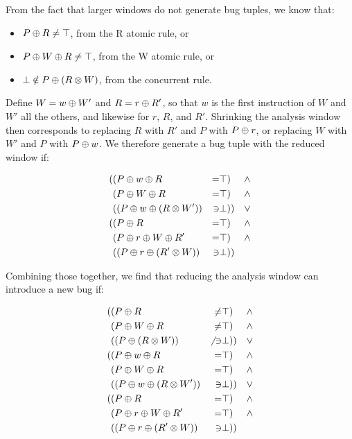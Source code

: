 From the fact that larger windows do not generate bug tuples, we know
that:

\begin{itemize}
\item $P \oplus R \not= \top$, from the R atomic rule, or
\item $P \oplus W \oplus R \not= \top$, from the W atomic rule, or
\item $\bot \notin P \oplus (R \otimes W)$, from the concurrent rule.
\end{itemize}

Define $W = w \oplus W'$ and $R = r \oplus R'$, so
that $w$ is the first instruction of $W$ and $W'$ all the others, and
likewise for $r$, $R$, and $R'$.  Shrinking the analysis window then
corresponds to replacing $R$ with $R'$ and $P$ with $P
\oplus r$, or replacing $W$ with $W'$ and $P$ with $P
\oplus w$.  We therefore generate a bug tuple with the
reduced window if:

\begin{align*}
( & (P \oplus w \oplus R & = & \top) & \wedge \\
  & (P \oplus W \oplus R & = & \top) & \wedge \\
  & ((P \oplus w \oplus (R \otimes W')) & \ni & \bot)) & \vee \\
( & (P \oplus R & = & \top) & \wedge \\
  & (P \oplus r \oplus W \oplus R' & = & \top) & \wedge \\
  & ((P \oplus r \oplus (R' \otimes W)) & \ni & \bot))
\end{align*}

Combining those together, we find that reducing the analysis window can introduce a new bug if:

\begin{align*}
( & (P \oplus R & \not= & \top) & \wedge \\
  & (P \oplus W \oplus R & \not= & \top) & \wedge \\
  & ((P \oplus (R \otimes W)) & \not{}\ni & \bot)) & \vee \\
( & (P \oplus w \oplus R & = & \top) & \wedge \\
  & (P \oplus W \oplus R & = & \top) & \wedge \\
  & ((P \oplus w \oplus (R \otimes W')) & \ni & \bot)) & \vee \\
( & (P \oplus R & = & \top) & \wedge \\
  & (P \oplus r \oplus W \oplus R' & = & \top) & \wedge \\
  & ((P \oplus r \oplus (R' \otimes W)) & \ni & \bot))
\end{align*}

